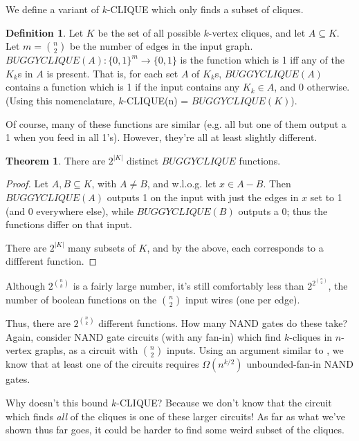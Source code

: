 \documentclass[12pt]{article}
\theoremstyle{definition}
\newtheorem{thm}{Theorem}[section]
\newtheorem{defn}{Definition}[section]
\begin{document}
We define a variant of $k$-CLIQUE which only
finds a subset of cliques.

\begin{defn}
\label{BUGGYCLIQUE}
Let $K$ be the set of all possible
$k$-vertex cliques, and let $A \subseteq K$.
Let $m = {n \choose 2}$ be the number of edges in the input graph.
$BUGGYCLIQUE(A): \{0,1\}^m \rightarrow \{0,1\}$ is the function which
is 1 iff any of the $K_k$s in $A$ is present.
That is, for each set $A$ of $K_k$s, $BUGGYCLIQUE(A)$
contains a function which is 1 if the input contains any $K_k \in A$,
and 0 otherwise. (Using this nomenclature,
$k$-CLIQUE(n) = $BUGGYCLIQUE(K)$).
\end{defn}

Of course, many of these functions are similar (e.g. all but one of them
output a 1 when you feed in all 1's). However, they're all at least
slightly different.

\begin{thm}
\label{buggyDistinct}
There are  $2^{|K|}$ distinct $BUGGYCLIQUE$ functions.
\end{thm}
\begin{proof}

Let $A,B \subseteq K$, with $A \neq B$, and w.l.o.g.
let $x \in A-B$. Then $BUGGYCLIQUE(A)$ outputs 1 on the input
with just the edges in $x$ set to 1 (and 0 everywhere else),
while $BUGGYCLIQUE(B)$ outputs a 0; thus the functions differ
on that input.

There are $2^{|K|}$ many subsets of $K$,
and by the above, each corresponds to a diffferent function.
\end{proof}

Although $2^{n \choose k}$ is a fairly large number,
it's still comfortably less than $2^{2^{n \choose 2}}$, the number of boolean
functions on the ${n \choose 2}$ input wires (one per edge).

Thus, there are $2^{n \choose k}$ different functions. 
How many NAND gates do these take?
Again, consider NAND gate circuits (with any fan-in) which find $k$-cliques in $n$-vertex
graphs, as a circuit with $n \choose 2$ inputs. Using an argument similar to
\cite{shannon_synthesis_1949}, we know that at least one of the circuits requires
$\Omega(n^{k/2})$ unbounded-fan-in NAND gates.

Why doesn't this bound $k$-CLIQUE?
Because we don't know that the circuit which finds {\em all} of the
cliques is one of these larger circuits! As far as what we've
shown thus far goes, it could be harder to find some weird subset of the cliques.
\end{document}
